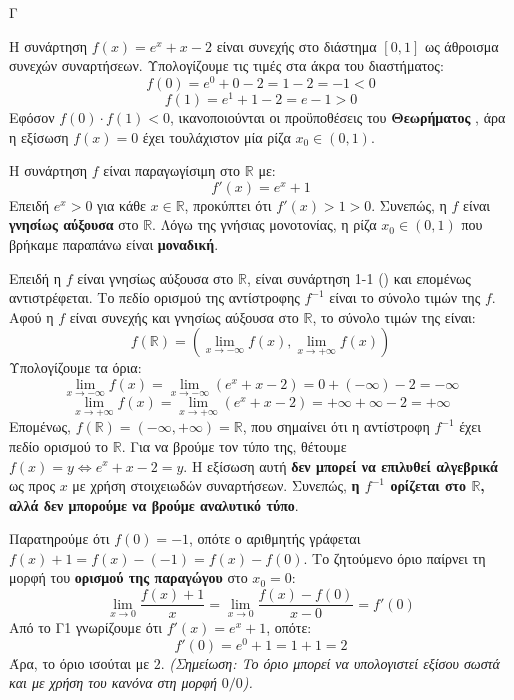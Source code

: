 \begin{thema}{Γ}
\begin{erwthma}
\item Η συνάρτηση $f(x) = e^x + x - 2$ είναι συνεχής στο διάστημα $[0, 1]$ ως άθροισμα συνεχών συναρτήσεων.
Υπολογίζουμε τις τιμές στα άκρα του διαστήματος:
\[ f(0) = e^0 + 0 - 2 = 1 - 2 = -1 < 0 \]
\[ f(1) = e^1 + 1 - 2 = e - 1 > 0 \]
Εφόσον $f(0) \cdot f(1) < 0$, ικανοποιούνται οι προϋποθέσεις του \textbf{Θεωρήματος }, άρα η εξίσωση $f(x) = 0$ έχει τουλάχιστον μία ρίζα $x_0 \in (0, 1)$.

Η συνάρτηση $f$ είναι παραγωγίσιμη στο $\mathbb{R}$ με:
\[ f'(x) = e^x + 1 \]
Επειδή $e^x > 0$ για κάθε $x \in \mathbb{R}$, προκύπτει ότι $f'(x) > 1 > 0$. Συνεπώς, η $f$ είναι \textbf{γνησίως αύξουσα} στο $\mathbb{R}$. 
Λόγω της γνήσιας μονοτονίας, η ρίζα $x_0 \in (0, 1)$ που βρήκαμε παραπάνω είναι \textbf{μοναδική}.

\item Επειδή η $f$ είναι γνησίως αύξουσα στο $\mathbb{R}$, είναι συνάρτηση 1-1 () και επομένως αντιστρέφεται. 
Το πεδίο ορισμού της αντίστροφης $f^{-1}$ είναι το σύνολο τιμών της $f$. Αφού η $f$ είναι συνεχής και γνησίως αύξουσα στο $\mathbb{R}$, το σύνολο τιμών της είναι:
\[ f(\mathbb{R}) = \left( \lim_{x \to -\infty} f(x), \lim_{x \to +\infty} f(x) \right) \]
Υπολογίζουμε τα όρια:
\[ \lim_{x \to -\infty} f(x) = \lim_{x \to -\infty} (e^x + x - 2) = 0 + (-\infty) - 2 = -\infty \]
\[ \lim_{x \to +\infty} f(x) = \lim_{x \to +\infty} (e^x + x - 2) = +\infty + \infty - 2 = +\infty \]
Επομένως, $f(\mathbb{R}) = (-\infty, +\infty) = \mathbb{R}$, που σημαίνει ότι η αντίστροφη $f^{-1}$ έχει πεδίο ορισμού το $\mathbb{R}$.
Για να βρούμε τον τύπο της, θέτουμε $f(x) = y \Leftrightarrow e^x + x - 2 = y$. Η εξίσωση αυτή \textbf{δεν μπορεί να επιλυθεί αλγεβρικά} ως προς $x$ με χρήση στοιχειωδών συναρτήσεων. Συνεπώς, \textbf{η $f^{-1}$ ορίζεται στο $\mathbb{R}$, αλλά δεν μπορούμε να βρούμε αναλυτικό τύπο}.

\item Παρατηρούμε ότι $f(0) = -1$, οπότε ο αριθμητής γράφεται $f(x) + 1 = f(x) - (-1) = f(x) - f(0)$.
Το ζητούμενο όριο παίρνει τη μορφή του \textbf{ορισμού της παραγώγου} στο $x_0 = 0$:
\[ \lim_{x \to 0} \frac{f(x) + 1}{x} = \lim_{x \to 0} \frac{f(x) - f(0)}{x - 0} = f'(0) \]
Από το Γ1 γνωρίζουμε ότι $f'(x) = e^x + 1$, οπότε:
\[ f'(0) = e^0 + 1 = 1 + 1 = 2 \]
Άρα, το όριο ισούται με ${2}$.
\textit{(Σημείωση: Το όριο μπορεί να υπολογιστεί εξίσου σωστά και με χρήση του κανόνα  στη μορφή $0/0$).}


\end{erwthma}
\end{thema}
